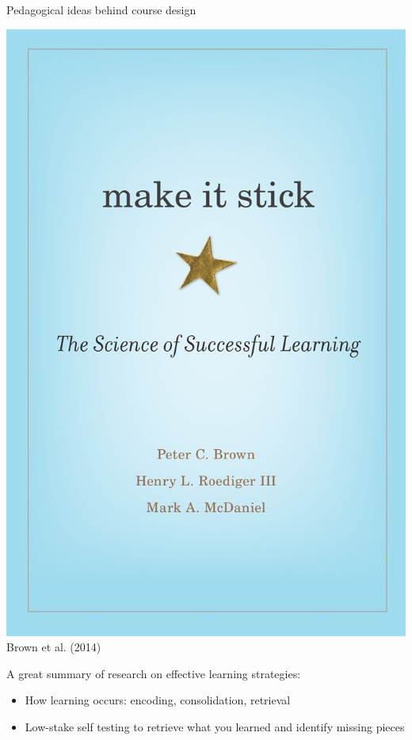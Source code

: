 \documentclass[aspectratio=169]{beamer}
\newenvironment{Slide}[1]%
  {\begin{frame}[environment=Slide]{#1}}
  {\end{frame}}%
\begin{document}
  \begin{Slide}{Pedagogical ideas behind course design}
    \begin{minipage}{0.3\textwidth}
      \includegraphics[height=0.6\textheight]{Pictures/brown}\\
      Brown et al. (2014)
    \end{minipage}%
    \begin{minipage}{0.7\textwidth}
      A great summary of research on effective learning strategies:
      \begin{itemize}
        \item How learning occurs: encoding, consolidation, retrieval
        \item Low-stake self testing to retrieve what you learned and identify missing pieces

\end{itemize}
\end{minipage}
\end{Slide}
\end{document}
